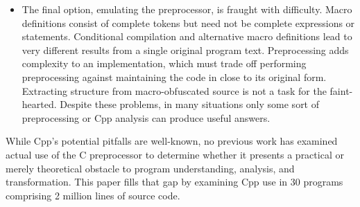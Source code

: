 \documentclass[10pt]{article}
\def\numpackages{30}
\def\numlines{2 million}
\begin{document}
\begin{itemize}
\item The final option, emulating the preprocessor, is fraught with
  difficulty.  Macro definitions consist of complete tokens but need not be
  complete expressions or statements.  Conditional compilation and
  alternative macro definitions lead to very different results from a
  single original program text.  Preprocessing adds complexity to an
  implementation, which must trade off performing preprocessing against
  maintaining the code in close to its original form.  Extracting structure
  from macro-obfuscated source is not a task for the faint-hearted.
  Despite these problems, in many situations only some sort of
  preprocessing or Cpp analysis can produce useful answers.

\end{itemize}


While  Cpp's potential pitfalls are well-known, no
previous work has examined actual use of the C preprocessor to
determine whether it presents a practical or merely theoretical
obstacle to program understanding, analysis, and transformation.  This
paper fills that gap by examining Cpp use in {\numpackages} programs
comprising {\numlines} lines of source code.
\end{document}
